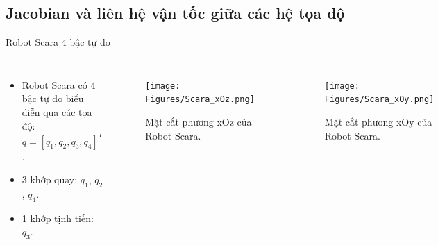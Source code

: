 \subsection{Jacobian và liên hệ vận tốc giữa các hệ tọa độ}

\begin{frame}{Robot Scara 4 bậc tự do}
    \begin{columns}
        \begin{itemize}
            \item Robot Scara có 4 bậc tự do biểu diễn qua các tọa độ: \( q = [q_1, q_2, q_3, q_4]^T \).
            \item 3 khớp quay: \(q_1\), \(q_2\), \(q_4\).
            \item 1 khớp tịnh tiến: \(q_3\).
        \end{itemize}
        \begin{figure}
            \centering
            \texttt{[image: Figures/Scara\_xOz.png]}
            \caption{Mặt cắt phương xOz của Robot Scara.}
            \label{fig:Scara_xOz}
        \end{figure}
        \begin{figure}
            \centering
            \texttt{[image: Figures/Scara\_xOy.png]}
            \caption{Mặt cắt phương xOy của Robot Scara.}
            \label{fig:Scara_xOy}
        \end{figure}
    \end{columns}
\end{frame}

